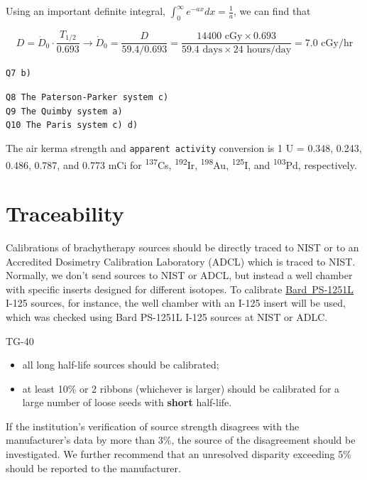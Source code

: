 \documentclass[]{book}
\providecommand{\tightlist}{%
  \setlength{\itemsep}{0pt}\setlength{\parskip}{0pt}}
\theoremstyle{definition}
\theoremstyle{definition}
\theoremstyle{definition}
\theoremstyle{remark}
\begin{document}
Using an important definite integral,
\(\int^{\infty}_0 e^{-ax} dx = \frac{1}{a}\), we can find that

\begin{equation*}
D = \dot D_0 \cdot \frac{T_{1/2}}{0.693} \rightarrow \dot D_0 = \frac{D}{59.4/0.693}=\frac{14400 \text{ cGy} \times 0.693}{59.4 \text{ days} \times 24 \text{ hours/day}} = \boxed{7.0\text{ cGy/hr}}
\end{equation*}

\texttt{Q7\ b)}

\texttt{Q8\ The\ Paterson-Parker\ system\ c)}\\
\texttt{Q9\ The\ Quimby\ system\ a)}\\
\texttt{Q10\ The\ Paris\ system\ c)\ d)}

The air kerma strength and \texttt{apparent\ activity} conversion is 1 U
= 0.348, 0.243, 0.486, 0.787, and 0.773 mCi for \textsuperscript{137}Cs,
\textsuperscript{192}Ir, \textsuperscript{198}Au,
\textsuperscript{125}I, and \textsuperscript{103}Pd, respectively.

\section{Traceability}\label{traceability}

Calibrations of brachytherapy sources should be directly traced to NIST
or to an Accredited Dosimetry Calibration Laboratory (ADCL) which is
traced to NIST. Normally, we don't send sources to NIST or ADCL, but
instead a well chamber with specific inserts designed for different
isotopes. To calibrate
\href{http://www.bardmedical.com/products/prostate-health/brachytherapy/source-and-delivery-systems/iodine-125/}{Bard~PS-1251L}
I-125 sources, for instance, the well chamber with an I-125 insert will
be used, which was checked using Bard PS-1251L I-125 sources at NIST or
ADLC.

TG-40

\begin{itemize}
\tightlist
\item
  all long half-life sources should be calibrated;
\item
  at least 10\% or 2 ribbons (whichever is larger) should be calibrated
  for a large number of loose seeds with \textbf{short} half-life.
\end{itemize}

If the institution's verification of source strength disagrees with the
manufacturer's data by more than 3\%, the source of the disagreement
should be investigated. We further recommend that an unresolved
disparity exceeding 5\% should be reported to the manufacturer.
\end{document}
